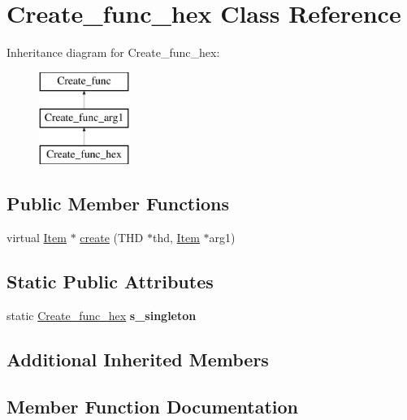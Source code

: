 \hypertarget{classCreate__func__hex}{}\section{Create\+\_\+func\+\_\+hex Class Reference}
\label{classCreate__func__hex}
Inheritance diagram for Create\+\_\+func\+\_\+hex\+:\begin{figure}[H]
\begin{center}
\leavevmode
\includegraphics[height=3.000000cm]{classCreate__func__hex}
\end{center}
\end{figure}
\subsection*{Public Member Functions}
\begin{DoxyCompactItemize}
\item 
virtual \mbox{\hyperlink{classItem}{Item}} $\ast$ \mbox{\hyperlink{classCreate__func__hex_ac82bb09424554c7b8b79e6995d6bbeca}{create}} (T\+HD $\ast$thd, \mbox{\hyperlink{classItem}{Item}} $\ast$arg1)
\end{DoxyCompactItemize}
\subsection*{Static Public Attributes}
\begin{DoxyCompactItemize}
\item 
\mbox{\label{classCreate__func__hex_a01eca4a6b0b2cde1613f53af77b1d5e5}} 
static \mbox{\hyperlink{classCreate__func__hex}{Create\+\_\+func\+\_\+hex}} {\bfseries s\+\_\+singleton}
\end{DoxyCompactItemize}
\subsection*{Additional Inherited Members}


\subsection{Member Function Documentation}
\mbox{\label{classCreate__func__hex_ac82bb09424554c7b8b79e6995d6bbeca}} 
